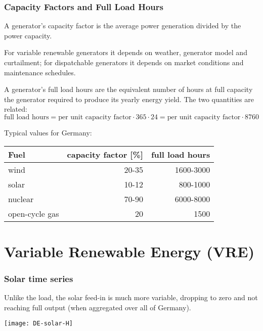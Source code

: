 \documentclass[10pt,aspectratio=169,dvipsnames]{beamer}
\begin{document}
\begin{frame}
  \frametitle{Capacity Factors and Full Load Hours}


  A generator's \alert{capacity factor} is the average power generation divided by the power capacity.

  For variable renewable generators it depends on weather, generator model and
  curtailment; for dispatchable generators it depends on market
  conditions and maintenance schedules.

  A generator's \alert{full load hours} are the equivalent number of hours at full capacity the generator required to produce its yearly energy yield.  The two quantities are related:
  \begin{equation*}
    \textrm{full load hours} = \textrm{per unit capacity factor} \cdot 365 \cdot 24 = \textrm{per unit capacity factor} \cdot 8760
  \end{equation*}


  Typical values for Germany:
  \begin{table}[!t]
    \begin{tabular}{lrr}
      \toprule
Fuel & capacity factor [\%] & full load hours \\
\midrule
wind & 20-35 & 1600-3000 \\
solar & 10-12 & 800-1000 \\
nuclear & 70-90 & 6000-8000 \\
open-cycle gas & 20 & 1500 \\
      \bottomrule
    \end{tabular}
  \end{table}


\end{frame}




\section{Variable Renewable Energy (VRE)}



\begin{frame}
  \frametitle{Solar time series}

  Unlike the load, the solar feed-in is much more variable, dropping to zero and not reaching full output (when aggregated over all of Germany).


  \centering
  \texttt{[image: DE-solar-H]}

\end{frame}
\end{document}

